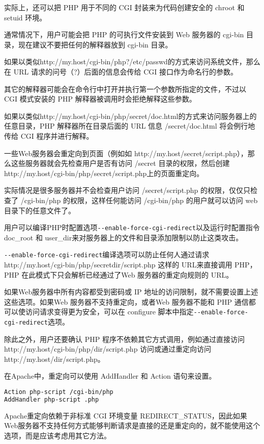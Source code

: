 实际上，还可以把 PHP 用于不同的 CGI 封装来为代码创建安全的 chroot 和 setuid 环境。

通常情况下，用户可能会把 PHP 的可执行文件安装到 Web 服务器的 cgi-bin 目录，现在建议不要把任何的解释器放到 cgi-bin 目录。

如果以类似http://my.host/cgi-bin/php?/etc/passwd的方式来访问系统文件，那么在 URL 请求的问号（?）后面的信息会传给 CGI 接口作为命名行的参数。

其它的解释器可能会在命令行中打开并执行第一个参数所指定的文件，不过以 CGI 模式安装的 PHP 解释器被调用时会拒绝解释这些参数。

如果以类似http://my.host/cgi-bin/php/secret/doc.html的方式来访问服务器上的任意目录，PHP 解释器所在目录后面的 URL 信息 /secret/doc.html 将会例行地传给 CGI 程序并进行解释。

一些Web服务器会重定向到页面（例如如 http://my.host/secret/script.php），那么这些服务器就会先检查用户是否有访问 /secret 目录的权限，然后创建 http://my.host/cgi-bin/php/secret/script.php上的页面重定向。

实际情况是很多服务器并不会检查用户访问 /secret/script.php 的权限，仅仅只检查了 /cgi-bin/php 的权限，这样任何能访问 /cgi-bin/php 的用户就可以访问 web 目录下的任意文件了。

用户可以编译PHP时配置选项\texttt{-\/-enable-force-cgi-redirect}以及运行时配置指令 doc\_root 和 user\_dir来对服务器上的文件和目录添加限制以防止这类攻击。

\texttt{-\/-enable-force-cgi-redirect}编译选项可以防止任何人通过请求http://my.host/cgi-bin/php/secretdir/script.php 这样的 URL来直接调用 PHP，PHP 在此模式下只会解析已经通过了Web 服务器的重定向规则的 URL。



如果Web服务器中所有内容都受到密码或 IP 地址的访问限制，就不需要设置上述这些选项。如果Web 服务器不支持重定向，或者Web 服务器不能和 PHP 通信都可以使访问请求变得更为安全，可以在 configure 脚本中指定\texttt{-\/-enable-force-cgi-redirect}选项。

除此之外，用户还要确认 PHP 程序不依赖其它方式调用，例如通过直接访问http://my.host/cgi-bin/php/dir/script.php 访问或通过重定向访问 http://my.host/dir/script.php。

在Apache中，重定向可以使用 AddHandler 和 Action 语句来设置。

\begin{lstlisting}[language=bash]
Action php-script /cgi-bin/php
AddHandler php-script .php
\end{lstlisting}


Apache重定向依赖于非标准 CGI 环境变量 REDIRECT\_STATUS，因此如果Web服务器不支持任何方式能够判断请求是直接的还是重定向的，就不能使用这个选项，而是应该考虑用其它方法。

